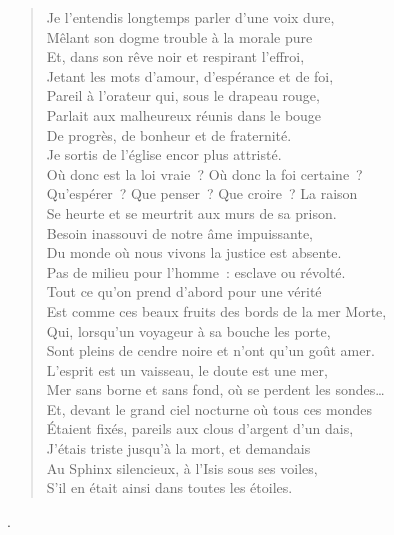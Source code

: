 \documentclass[french,twoside]{book} %
\begin{document}
{\begin{verse}
Je l’entendis longtemps parler d’une voix dure,\\
 Mêlant son dogme trouble à la morale pure\\
 Et, dans son rêve noir et respirant l’effroi,\\
 Jetant les mots d’amour, d’espérance et de foi,\\
 Pareil à l’orateur qui, sous le drapeau rouge,\\
 Parlait aux malheureux réunis dans le bouge\\
 De progrès, de bonheur et de fraternité.\\
 Je sortis de l’église encor plus attristé.\\
 Où donc est la loi vraie ? Où donc la foi certaine ?\\
 Qu’espérer ? Que penser ? Que croire ? La raison\\
 Se heurte et se meurtrit aux murs de sa prison.\\
 Besoin inassouvi de notre âme impuissante,\\
 Du monde où nous vivons la justice est absente.\\
 Pas de milieu pour l’homme : esclave ou révolté.\\
 Tout ce qu’on prend d’abord pour une vérité\\
 Est comme ces beaux fruits des bords de la mer Morte,\\
 Qui, lorsqu’un voyageur à sa bouche les porte,\\
 Sont pleins de cendre noire et n’ont qu’un goût amer.\\
 L’esprit est un vaisseau, le doute est une mer,\\
 Mer sans borne et sans fond, où se perdent les sondes…\\
 Et, devant le grand ciel nocturne où tous ces mondes\\
 Étaient fixés, pareils aux clous d’argent d’un dais,\\
J’étais triste jusqu’à la mort, et demandais\\
Au Sphinx silencieux, à l’Isis sous ses voiles,\\
S’il en était ainsi dans toutes les étoiles.\\
\end{verse}
}.
\end{document}
